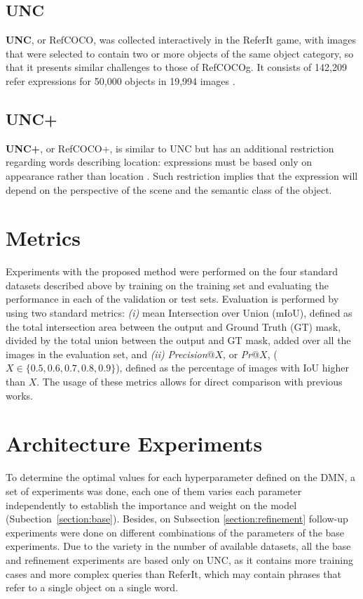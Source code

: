 \subsection{UNC}
\textbf{UNC}, or RefCOCO, was collected interactively in the ReferIt game, with images that were selected to contain two or more objects of the same object category, so that it presents similar challenges to those of RefCOCOg. It consists of 142,209 refer expressions for 50,000 objects in 19,994 images \cite{DBLP:journals/corr/YuPYBB16}.

\subsection{UNC+}
\textbf{UNC+}, or RefCOCO+, is similar to UNC but has an additional restriction regarding words describing location: expressions must be based only on appearance rather than location \cite{DBLP:journals/corr/YuPYBB16}. Such restriction implies that the expression will depend on the perspective of the scene and the semantic class of the object.


\section{Metrics}
Experiments with the proposed method were performed on the four standard datasets described above by training on the training set and evaluating the performance in each of the validation or test sets. Evaluation is performed by using two standard metrics: \textit{(i)} mean Intersection over Union (mIoU), defined as the total intersection area between the output and Ground Truth (GT) mask, divided by the total union between the output and GT mask, added over all the images in the evaluation set, and \textit{(ii)} \textit{Precision}$@X$, or \textit{Pr}$@X$, ($X \in \{0.5, 0.6, 0.7, 0.8, 0.9\}$), defined as the percentage of images with IoU higher than $X$. The usage of these metrics allows for direct comparison with previous works.

\section{Architecture Experiments}
To determine the optimal values for each hyperparameter defined on the DMN, a set of experiments was done, each one of them varies each parameter independently to establish the importance and weight on the model (Subection~\ref{section:base}). Besides, on Subsection \ref{section:refinement} follow-up experiments were done on different combinations of the parameters of the base experiments. Due to the variety in the number of available datasets, all the base and refinement experiments are based only on UNC, as it contains more training cases and more complex queries than ReferIt, which may contain phrases that refer to a single object on a single word.

